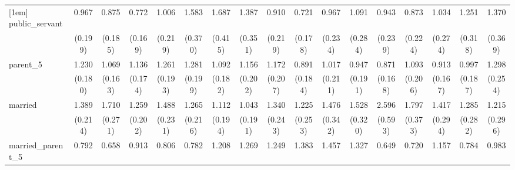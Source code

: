 {\begin{tabular}{l*{16}{c}}
[1em]
public\_servant      &       0.967         &       0.875         &       0.772         &       1.006         &       1.583\sym{*}  &       1.687\sym{*}  &       1.387         &       0.910         &       0.721         &       0.967         &       1.091         &       0.943         &       0.873         &       1.034         &       1.251         &       1.370         \\
                    &     (0.199)         &     (0.185)         &     (0.169)         &     (0.219)         &     (0.370)         &     (0.415)         &     (0.351)         &     (0.219)         &     (0.178)         &     (0.234)         &     (0.284)         &     (0.239)         &     (0.224)         &     (0.274)         &     (0.318)         &     (0.369)         \\
[1em]
parent\_5            &       1.230         &       1.069         &       1.136         &       1.261         &       1.281         &       1.092         &       1.156         &       1.172         &       0.891         &       1.017         &       0.947         &       0.871         &       1.093         &       0.913         &       0.997         &       1.298         \\
                    &     (0.180)         &     (0.163)         &     (0.174)         &     (0.193)         &     (0.199)         &     (0.182)         &     (0.202)         &     (0.207)         &     (0.184)         &     (0.211)         &     (0.191)         &     (0.168)         &     (0.206)         &     (0.167)         &     (0.187)         &     (0.254)         \\
[1em]
married             &       1.389\sym{*}  &       1.710\sym{***}&       1.259         &       1.488\sym{*}  &       1.265         &       1.112         &       1.043         &       1.340         &       1.225         &       1.476         &       1.528\sym{*}  &       2.596\sym{***}&       1.797\sym{**} &       1.417         &       1.285         &       1.215         \\
                    &     (0.214)         &     (0.271)         &     (0.202)         &     (0.231)         &     (0.216)         &     (0.194)         &     (0.191)         &     (0.243)         &     (0.253)         &     (0.342)         &     (0.320)         &     (0.593)         &     (0.373)         &     (0.294)         &     (0.282)         &     (0.296)         \\
[1em]
married\_parent\_5    &       0.792         &       0.658         &       0.913         &       0.806         &       0.782         &       1.208         &       1.269         &       1.249         &       1.383         &       1.457         &       1.327         &       0.649         &       0.720         &       1.157         &       0.784         &       0.983         \\

\end{tabular}}
